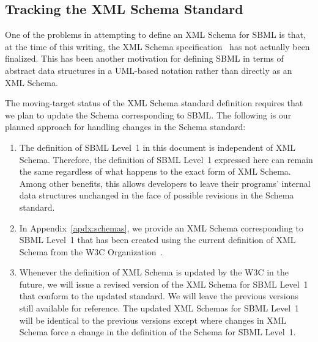 \documentclass[10pt]{cekarticle}
\begin{document}
\subsection{Tracking the XML Schema Standard}
\label{sec:tracking-xml}

One of the problems in attempting to define an XML Schema for SBML is that,
at the time of this writing, the XML Schema
specification~\citep{biron:2000,thompson:2000} has not actually been
finalized.  This has been another motivation for defining SBML in terms of
abstract data structures in a UML-based notation rather than directly as an
XML Schema.

The moving-target status of the XML Schema standard definition requires
that we plan to update the Schema corresponding to SBML.  The following
is our planned approach for handling changes in the Schema standard:
\begin{enumerate}
  
\item The definition of SBML Level~1 in this document is independent of XML
  Schema.  Therefore, the definition of SBML Level~1 expressed here can
  remain the same regardless of what happens to the exact form of XML
  Schema.  Among other benefits, this allows developers to leave their
  programs' internal data structures unchanged in the face of possible
  revisions in the Schema standard.
  
\item In Appendix~\ref{apdx:schemas}, we provide an XML Schema
  corresponding to SBML Level~1 that has been created using the current
  definition of XML Schema from the W3C
  Organization~\citep{biron:2000,thompson:2000}.
  
\item Whenever the definition of XML Schema is updated by the W3C in the
  future, we will issue a revised version of the XML Schema for SBML
  Level~1 that conform to the updated standard.  We will leave the previous
  versions still available for reference.  The updated XML Schemas for SBML
  Level~1 will be identical to the previous versions except where changes
  in XML Schema force a change in the definition of the Schema for SBML
  Level~1.

\end{enumerate}


\end{document}
